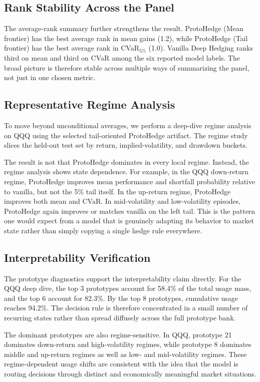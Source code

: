 \documentclass[11pt]{article}
\begin{document}
\subsection{Rank Stability Across the Panel}
The average-rank summary further strengthens the result. ProtoHedge (Mean frontier) has the best average rank in mean gains (1.2), while ProtoHedge (Tail frontier) has the best average rank in CVaR$_{5\%}$ (1.0). Vanilla Deep Hedging ranks third on mean and third on CVaR among the six reported model labels. The broad picture is therefore stable across multiple ways of summarizing the panel, not just in one chosen metric.

\subsection{Representative Regime Analysis}
To move beyond unconditional averages, we perform a deep-dive regime analysis on QQQ using the selected tail-oriented ProtoHedge artifact. The regime study slices the held-out test set by return, implied-volatility, and drawdown buckets.

The result is not that ProtoHedge dominates in every local regime. Instead, the regime analysis shows state dependence. For example, in the QQQ down-return regime, ProtoHedge improves mean performance and shortfall probability relative to vanilla, but not the 5\% tail itself. In the up-return regime, ProtoHedge improves both mean and CVaR. In mid-volatility and low-volatility episodes, ProtoHedge again improves or matches vanilla on the left tail. This is the pattern one would expect from a model that is genuinely adapting its behavior to market state rather than simply copying a single hedge rule everywhere.

\subsection{Interpretability Verification}
The prototype diagnostics support the interpretability claim directly. For the QQQ deep dive, the top 3 prototypes account for 58.4\% of the total usage mass, and the top 6 account for 82.3\%. By the top 8 prototypes, cumulative usage reaches 94.2\%. The decision rule is therefore concentrated in a small number of recurring states rather than spread diffusely across the full prototype bank.

The dominant prototypes are also regime-sensitive. In QQQ, prototype 21 dominates down-return and high-volatility regimes, while prototype 8 dominates middle and up-return regimes as well as low- and mid-volatility regimes. These regime-dependent usage shifts are consistent with the idea that the model is routing decisions through distinct and economically meaningful market situations.
\end{document}
